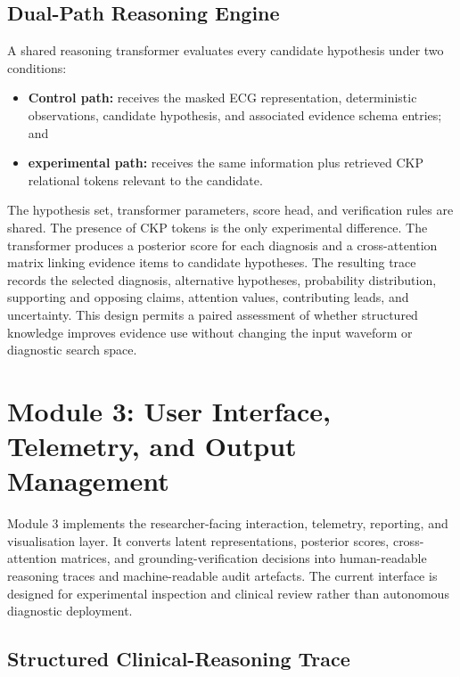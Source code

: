 \documentclass{ssnreview}
\begin{document}
\subsection{Dual-Path Reasoning Engine}

A shared reasoning transformer evaluates every candidate hypothesis under two conditions:

\begin{itemize}
  \item \textbf{Control path:} receives the masked ECG representation, deterministic
  observations, candidate hypothesis, and associated evidence schema entries; and

  \item \textbf{experimental path:} receives the same information plus retrieved CKP
  relational tokens relevant to the candidate.
\end{itemize}

The hypothesis set, transformer parameters, score head, and verification rules are shared.
The presence of CKP tokens is the only experimental difference. The transformer produces
a posterior score for each diagnosis and a cross-attention matrix linking evidence items
to candidate hypotheses.
The resulting trace records the selected diagnosis, alternative hypotheses, probability
distribution, supporting and opposing claims, attention values, contributing leads, and
uncertainty. This design permits a paired assessment of whether structured knowledge
improves evidence use without changing the input waveform or diagnostic search space.

\section{Module 3: User Interface, Telemetry, and Output Management}

Module 3 implements the researcher-facing interaction, telemetry, reporting, and
visualisation layer. It converts latent representations, posterior scores, cross-attention
matrices, and grounding-verification decisions into human-readable reasoning traces and
machine-readable audit artefacts. The current interface is designed for experimental
inspection and clinical review rather than autonomous diagnostic deployment.

\subsection{Structured Clinical-Reasoning Trace}
\end{document}
